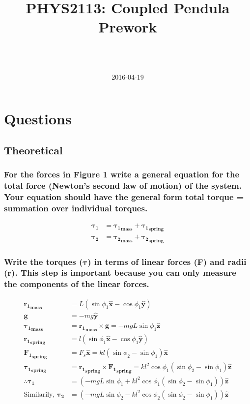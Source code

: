 \documentclass[a4paper]{scrartcl}
\begin{document}
\title{PHYS2113: Coupled Pendula Prework}
\author{ \\ \\ }
\date{2016-04-19}
\maketitle

\section{Questions}
\subsection{Theoretical}
\subsubsection{For the forces in Figure 1 write a general equation for the total force (Newton's second law of motion) of the system. Your equation should have the general form total torque = summation over individual torques.}
\begin{align*}
    \boldsymbol{\tau_1} &= \boldsymbol{\tau_1}_\mathbf{mass} + \boldsymbol{\tau_1}_\mathbf{spring} \\
    \boldsymbol{\tau_2} &= \boldsymbol{\tau_2}_\mathbf{mass} + \boldsymbol{\tau_2}_\mathbf{spring}
\end{align*}

\subsubsection{Write the torques (\(\boldsymbol{\tau}\)) in terms of linear forces (\(\mathbf{F}\)) and radii (\(\mathbf{r}\)). This step is important because you can only measure the components of the linear forces.}
\begin{align*}
    \mathbf{{r_1}_{mass}} &= L (\sin \phi_1 \mathbf{\hat{x}} - \cos \phi_1 \mathbf{\hat{y}}) \\
    \mathbf{g} &= -m g \mathbf{\hat{y}} \\
    \boldsymbol{\tau_1}_\mathbf{mass} &= \mathbf{{r_1}_{mass}} \times \mathbf{g} = -m g L \sin \phi_1 \mathbf{\hat{z}} \\
    \mathbf{{r_1}_{spring}} &= l (\sin \phi_1 \mathbf{\hat{x}} - \cos \phi_1 \mathbf{\hat{y}}) \\
    \mathbf{{F_1}_{spring}} &= F_s \mathbf{\hat{x}} = k l (\sin \phi_2 - \sin \phi_1) \mathbf{\hat{x}} \\
    \boldsymbol{\tau_1}_\mathbf{spring} &= \mathbf{{r_1}_{spring}} \times \mathbf{{F_1}_{spring}} = k l^2 \cos \phi_1 (\sin \phi_2 - \sin \phi_1) \mathbf{\hat{z}} \\
    \therefore \boldsymbol{\tau_1} &= (-m g L \sin \phi_1 + k l^2 \cos \phi_1 (\sin \phi_2 - \sin \phi_1)) \mathbf{\hat{z}} \\
    \text{Similarily, } \boldsymbol{\tau_2} &= (-m g L \sin \phi_2 - k l^2 \cos \phi_2 (\sin \phi_2 - \sin \phi_1)) \mathbf{\hat{z}}
\end{align*}
\end{document}
